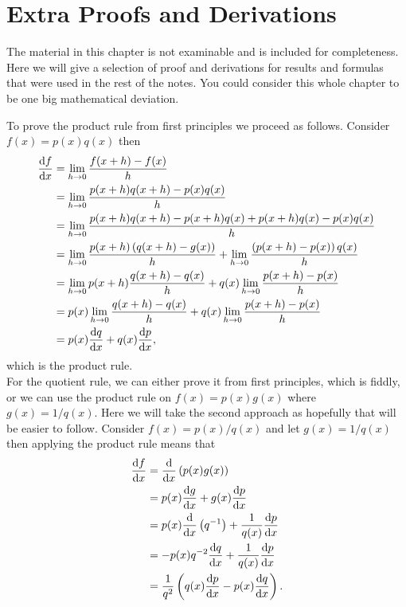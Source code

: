 \chapter{Extra Proofs and Derivations}
\label{sec: proofs}
The material in this chapter is not examinable and is included for completeness. Here we will give a selection of proof and derivations for results and formulas that were used in the rest of the notes. You could consider this whole chapter to be one big mathematical deviation.

To prove the product rule from first principles we proceed as follows. Consider $f(x)=p(x)q(x)$ then
\begin{align*}
\frac{\mathrm{d} f}{\mathrm{d} x}		&=\lim_{h\to 0}\frac{f(x+h)-f(x)}{h}\\
				&=\lim_{h\to 0}\frac{p(x+h)q(x+h)-p(x)q(x)}{h}\\
				&=\lim_{h\to 0}\frac{p(x+h)q(x+h)-p(x+h)q(x)+p(x+h)q(x)-p(x)q(x)}{h}\\
				&=\lim_{h\to0}\frac{p(x+h)\left(q(x+h)-g(x)\right)}{h}+\lim_{h\to 0}\frac{\left(p(x+h)-p(x)\right)q(x)}{h}\\
				&=\lim_{h\to 0}p(x+h)\frac{q(x+h)-q(x)}{h}+q(x)\lim_{h\to 0}\frac{p(x+h)-p(x)}{h}\\
				&=p(x)\lim_{h\to 0}\frac{q(x+h)-q(x)}{h}+q(x)\lim_{h\to 0}\frac{p(x+h)-p(x)}{h}\\
				&=p(x)\frac{\mathrm{d} q}{\mathrm{d} x}+q(x)\frac{\mathrm{d} p}{\mathrm{d} x},
\end{align*}
which is the product rule.\\

For the quotient rule, we can either prove it from first principles, which is fiddly, or we can use the product rule on $f(x)=p(x)g(x)$ where $g(x)=1/q(x)$.  Here we will take the second approach as hopefully that will be easier to follow.  Consider $f(x)=p(x)/q(x)$ and let $g(x)=1/q(x)$ then applying the product rule means that
\begin{align*}
\frac{\mathrm{d} f}{\mathrm{d} x}		&=\frac{\mathrm{d} }{\mathrm{d} x}\left(p(x)g(x)\right)\\
				&=p(x)\frac{\mathrm{d} g}{\mathrm{d} x}+g(x)\frac{\mathrm{d} p}{\mathrm{d} x}\\
				&=p(x)\frac{\mathrm{d}}{\mathrm{d} x}\left(q^{-1}\right)+\frac{1}{q(x)}\frac{\mathrm{d} p}{\mathrm{d} x}\\
				&=-p(x)q^{-2}\frac{\mathrm{d} q}{\mathrm{d} x}+\frac{1}{q(x)}\frac{\mathrm{d} p}{\mathrm{d} x}\\
				&=\frac{1}{q^{2}}\left(q(x)\frac{\mathrm{d} p}{\mathrm{d} x}-p(x)\frac{\mathrm{d} q}{\mathrm{d} x}\right).
\end{align*}

